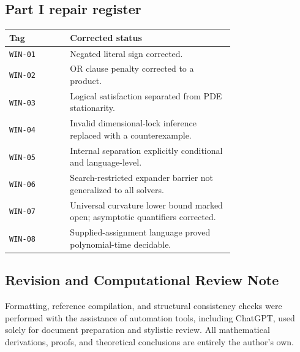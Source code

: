 \documentclass[12pt]{article}
\theoremstyle{remark}
\begin{document}
\subsection{Part I repair register}
\begin{center}\small
\begin{tabular}{@{}lp{0.73\linewidth}@{}}\toprule
Tag & Corrected status\\\midrule
\texttt{WIN-01} & Negated literal sign corrected.\\
\texttt{WIN-02} & OR clause penalty corrected to a product.\\
\texttt{WIN-03} & Logical satisfaction separated from PDE stationarity.\\
\texttt{WIN-04} & Invalid dimensional-lock inference replaced with a counterexample.\\
\texttt{WIN-05} & Internal separation explicitly conditional and language-level.\\
\texttt{WIN-06} & Search-restricted expander barrier not generalized to all solvers.\\
\texttt{WIN-07} & Universal curvature lower bound marked open; asymptotic quantifiers corrected.\\
\texttt{WIN-08} & Supplied-assignment language proved polynomial-time decidable.\\\bottomrule
\end{tabular}
\end{center}

\subsection{Revision and Computational Review Note} %
Formatting, reference compilation, and structural consistency checks were performed with the assistance of automation tools, including ChatGPT, used solely for document preparation and stylistic review. All mathematical derivations, proofs, and theoretical conclusions are entirely the author's own.
\end{document}
